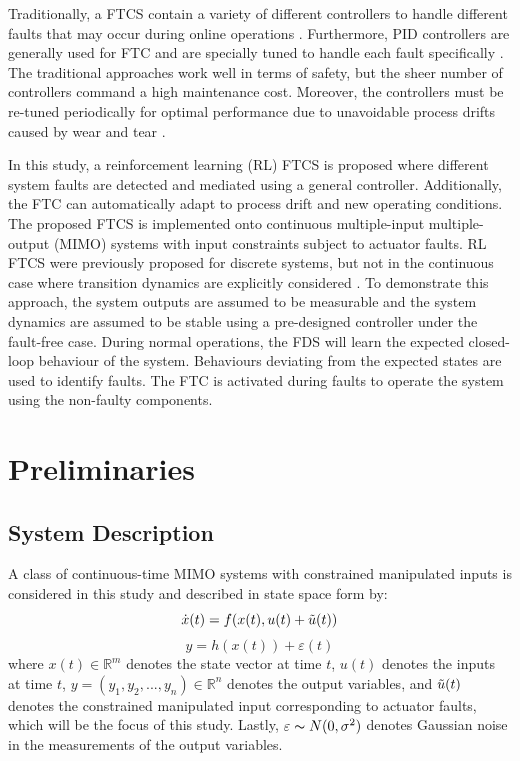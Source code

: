 Traditionally, a FTCS contain a variety of different controllers to handle different faults that may occur during online operations \cite{ftc_book_ref1}. Furthermore, PID controllers are generally used for FTC and are specially tuned to handle each fault specifically \cite{process_faults}. The traditional approaches work well in terms of safety, but the sheer number of controllers command a  high maintenance cost.  Moreover, the controllers must be re-tuned periodically for optimal performance due to unavoidable process drifts caused by wear and tear \cite{process_control_ref13}.

In this study, a reinforcement learning (RL) FTCS is proposed where different system faults are detected and mediated using a general controller. Additionally, the FTC can automatically adapt to process drift and new operating conditions. The proposed FTCS is implemented onto continuous multiple-input multiple-output (MIMO) systems with input constraints subject to actuator faults. RL FTCS were previously proposed for discrete systems, but not in the continuous case where transition dynamics are explicitly considered \cite{ftc_ex2_ref5, ftc_ex1_ref6}. To demonstrate this approach, the system outputs are assumed to be measurable and the system dynamics are assumed to be stable using a pre-designed controller under the fault-free case.  During normal operations, the FDS will learn the expected closed-loop behaviour of the system.  Behaviours deviating from the expected states are used to identify faults. The FTC is activated during faults to operate the system using the non-faulty components.

\section{Preliminaries}
\subsection{System Description}
A class of continuous-time MIMO systems with constrained manipulated inputs is considered in this study and described in state space form by:
\begin{equation}
\dot{x}(t) = f(x(t), u(t) + \Tilde{u}(t))
\label{eq:system_states}
\end{equation}
\begin{equation}
y = h(x(t)) + \varepsilon(t)
\label{eq:system_output}
\end{equation}
where $x(t) \in {\mathbb{R}}^m$ denotes the state vector at time $t$, $u(t)$ denotes the inputs at time $t$, $y = (y_{1}, y_{2}, ..., y_{n}) \in {\mathbb{R}}^n$ denotes the output variables, and $\Tilde{u}(t)$ denotes the constrained manipulated input corresponding to actuator faults, which will be the focus of this study. Lastly, $\varepsilon \thicksim N(0, \sigma^2)$ denotes Gaussian noise in the measurements of the output variables.

